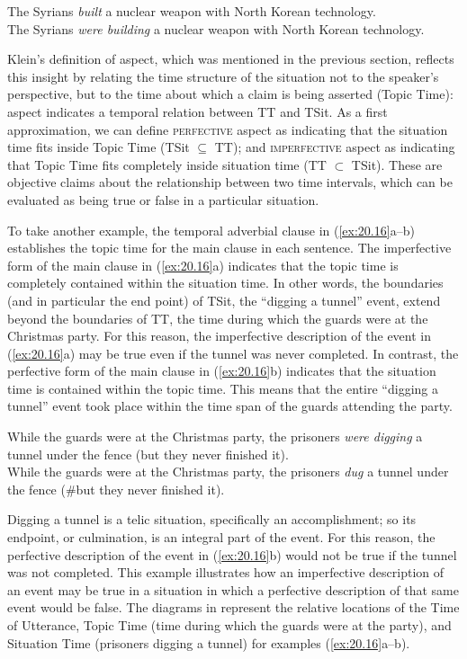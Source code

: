 \ea \label{ex:20.15}
\ea  The Syrians \textit{built} a nuclear weapon with North Korean technology.\\
\ex The Syrians \textit{were building} a nuclear weapon with North Korean technology.
                       \z
\z


Klein’s definition of aspect, which was mentioned in the previous section, reflects this insight by relating the time structure of the situation not to the speaker’s perspective, but to the time about which a claim is being asserted (Topic Time): aspect indicates a temporal relation between TT and TSit. As a first approximation, we can define \textsc{perfective} aspect as indicating that the situation time fits inside Topic Time (TSit ${\subseteq}$ TT); and \textsc{imperfective} aspect as indicating that Topic Time fits completely inside situation time (TT ${\subset}$ TSit). These are objective claims about the relationship between two time intervals, which can be evaluated as being true or false in a particular situation.



To take another example, the temporal adverbial clause in (\ref{ex:20.16}a--b) establishes the topic time for the main clause in each sentence. The imperfective form of the main clause in (\ref{ex:20.16}a) indicates that the topic time is completely contained within the situation time. In other words, the boundaries (and in particular the end point) of TSit, the “digging a tunnel” event, extend beyond the boundaries of TT, the time during which the guards were at the Christmas party. For this reason, the imperfective description of the event in (\ref{ex:20.16}a) may be true even if the tunnel was never completed. In contrast, the perfective form of the main clause in (\ref{ex:20.16}b) indicates that the situation time is contained within the topic time. This means that the entire “digging a tunnel” event took place within the time span of the guards attending the party.


\ea \label{ex:20.16}
\ea  While the guards were at the Christmas party, the prisoners \textit{were digging} a tunnel  under the fence (but they never finished it).\\
\ex While the guards were at the Christmas party, the prisoners \textit{dug} a tunnel under the fence (\#but they never finished it).
                       \z
\z


Digging a tunnel is a telic situation, specifically an accomplishment; so its endpoint, or culmination, is an integral part of the event. For this reason, the perfective description of the event in (\ref{ex:20.16}b) would not be true if the tunnel was not completed. This example illustrates how an imperfective description of an event may be true in a situation in which a perfective description of that same event would be false. The diagrams in  represent the relative locations of the Time of Utterance, Topic Time (time during which the guards were at the party), and Situation Time (prisoners digging a tunnel) for examples (\ref{ex:20.16}a--b).


